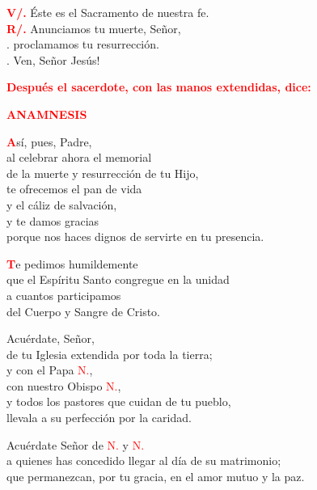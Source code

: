 \documentclass[12pt, letterpaper]{report}
\begin{document}
\Large \hspace{-0.9cm} {\bfseries \textcolor{red}{V/.}} \hspace{0.6cm} \'Este es el Sacramento de nuestra fe.\\
\Large \hspace{-0.9cm} {\bfseries \textcolor{red}{R/.}} \hspace{0.4cm} Anunciamos tu muerte, Se\~nor,\\
. \hspace{1.3cm} proclamamos tu resurrecci\'on.\\
. \hspace{1.3cm} Ven, Se\~nor Jes\'us!\newline

\large{\bfseries \textcolor{red}{Despu\'es el sacerdote, con las manos extendidas, dice:}} \newline


\Large {\bfseries \textcolor{red}{ANAMNESIS}}

\lettrine[lines=1]{\bfseries \textcolor{red}{A}}{}\Large s\'i, pues, Padre,\\
al celebrar ahora el memorial\\
de la muerte y resurrecci\'on de tu Hijo,\\
te ofrecemos el pan de vida \\
y el c\'aliz de salvaci\'on,\\
y te damos gracias\\
porque nos haces dignos de servirte en tu presencia.

\lettrine[lines=1]{\bfseries \textcolor{red}{T}}{}\Large e pedimos humildemente\\
que el Esp\'iritu Santo congregue en la unidad\\
a cuantos participamos\\
del Cuerpo y Sangre de Cristo.\newline

Acu\'erdate, Se\~nor,\\
de tu Iglesia extendida por toda la tierra; \\
y con el Papa \textcolor{red}{N.},\\
con nuestro Obispo \textcolor{red}{N.},\\
y todos los pastores que cuidan de tu pueblo,\\
llevala a su perfecci\'on por la caridad.\newline

Acu\'erdate Se\~nor de \textcolor{red}{N.} y \textcolor{red}{N.} \\
a quienes has concedido llegar al d\'ia de su matrimonio; \\
que permanezcan, por tu gracia, en el amor mutuo y la paz.
\end{document}
